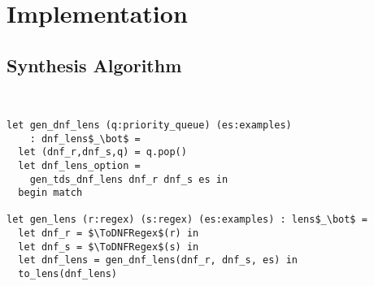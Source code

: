 \section{Implementation}


\subsection{Synthesis Algorithm}
\begin{lstlisting}[mathescape]


let gen_dnf_lens (q:priority_queue) (es:examples)
    : dnf_lens$_\bot$ =
  let (dnf_r,dnf_s,q) = q.pop()
  let dnf_lens_option =
    gen_tds_dnf_lens dnf_r dnf_s es in
  begin match 

let gen_lens (r:regex) (s:regex) (es:examples) : lens$_\bot$ =
  let dnf_r = $\ToDNFRegex$(r) in
  let dnf_s = $\ToDNFRegex$(s) in
  let dnf_lens = gen_dnf_lens(dnf_r, dnf_s, es) in
  to_lens(dnf_lens)
\end{lstlisting}
